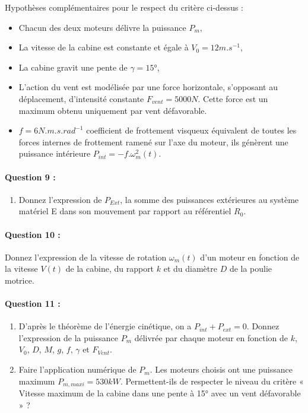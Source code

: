 Hypothèses complémentaires pour le respect du critère ci-dessus :
\begin{itemize}
 \item Chacun des deux moteurs délivre la puissance $P_m$,
 \item La vitesse de la cabine est constante et égale à $V_0=12m.s^{-1}$,
 \item La cabine gravit une pente de $\gamma=15°$,
 \item L'action du vent est modélisée par une force horizontale, s'opposant au déplacement, d'intensité constante $F_{vent}=5 000 N$. Cette force est un maximum obtenu uniquement par vent défavorable.
 \item $f=6 N.m.s.rad^{-1}$ coefficient de frottement visqueux équivalent de toutes les forces internes de frottement ramené sur l'axe du moteur, ils génèrent une puissance intérieure $P_{int}=-f.\omega_m^2(t)$.
\end{itemize}

\paragraph{Question 9 :}

\begin{enumerate}
 \item Donnez l'expression de $P_{Ext}$, la somme des puissances extérieures au système matériel E dans son mouvement par rapport au référentiel $R_0$.
\end{enumerate}

\paragraph{Question 10 :} Donnez l'expression de la vitesse de rotation $\omega_m(t)$ d'un moteur en fonction de la vitesse $V(t)$ de la cabine, du rapport $k$ et du diamètre $D$ de la poulie motrice.

\paragraph{Question 11 :}

\begin{enumerate}
 \item D'après le théorème de l'énergie cinétique, on a $P_{int}+P_{ext}=0$. Donnez l'expression de la puissance $P_m$ délivrée par chaque moteur en fonction de $k$, $V_0$, $D$, $M$, $g$, $f$, $\gamma$ et $F_{Vent}$. 
 \item Faire l'application numérique de $P_m$. Les moteurs choisis ont une puissance maximum $P_{m,maxi}=530kW$. Permettent-ils de respecter le niveau du critère « Vitesse maximum de la cabine dans une pente à 15° avec un vent défavorable » ? 
\end{enumerate}	

